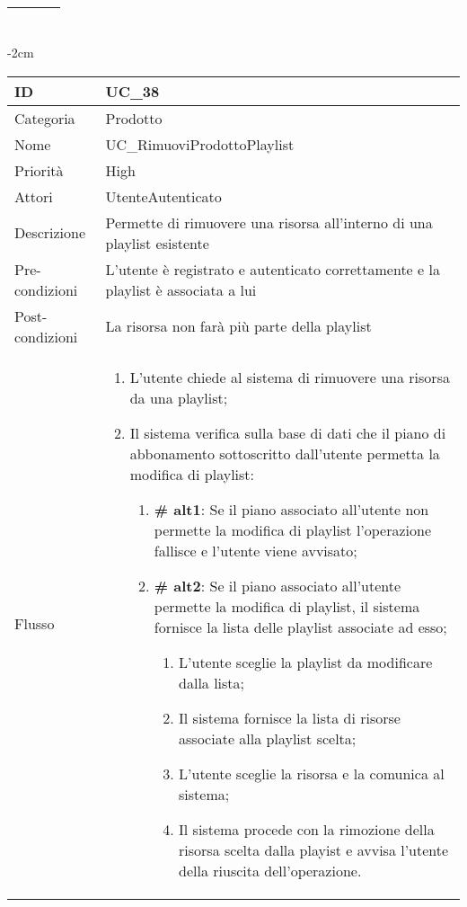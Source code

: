 \begin{center}
\begin{table}[bp]
\begin{tabular}{ |p{2.6cm}|p{13cm}|  }
\begin{enumerate}
		\end{enumerate}\\\hline
\end{tabular}
\label{table_use_case:37}\newline
\end{table}

\begin{table}[bp]
    \centering
    \addtolength{\leftskip} {-2cm}
\begin{tabular}{ |p{2.6cm}|p{13cm}|  }
\hline
ID & UC\_38\\\hline
Categoria & Prodotto \\\hline
Nome & UC\_RimuoviProdottoPlaylist\\\hline
Priorità & High \\\hline
Attori &  UtenteAutenticato \\\hline
Descrizione & Permette di rimuovere una risorsa all'interno di una playlist esistente\\\hline
Pre-condizioni & L'utente è registrato e autenticato correttamente e la playlist è associata a lui\\\hline
Post-condizioni & La risorsa non farà più parte della playlist\\\hline
Flusso &  	\begin{enumerate}
\item L'utente chiede al sistema di rimuovere una risorsa da una playlist;
		\item Il sistema verifica sulla base di dati che il piano di abbonamento sottoscritto dall'utente permetta la modifica di playlist:
		 \begin{enumerate}[label*=\arabic*.]
			\item \textbf{\# alt1}: Se il piano associato all'utente non permette la modifica di playlist l'operazione fallisce e l'utente viene avvisato;
			\item \textbf{\# alt2}: Se il piano associato all'utente permette la modifica di playlist, il sistema  fornisce la lista delle playlist associate ad esso;
			\begin{enumerate}[label*=\arabic*.]
				\item L'utente sceglie la playlist da modificare dalla lista;
				\item Il sistema fornisce la lista di risorse associate alla playlist scelta;
				\item L'utente sceglie la risorsa e la comunica al sistema;
				\item Il sistema procede con la rimozione della risorsa scelta dalla playist e avvisa l'utente della riuscita dell'operazione.
			\end{enumerate}
		\end{enumerate}
		\end{enumerate}\\\hline
\end{tabular}
\label{table_use_case:38}\newline


\end{table}
\end{center}

